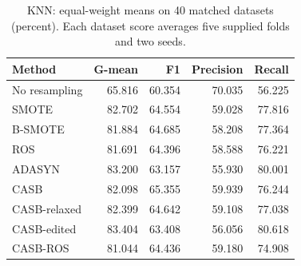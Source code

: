 \begin{table}[pos=!htbp]
\centering\small
\caption{KNN: equal-weight means on 40 matched datasets (percent). Each dataset score averages five supplied folds and two seeds.}\label{tab:scores_knn}
\begin{tabular}{lrrrr}\toprule
Method & G-mean & F1 & Precision & Recall \\
\midrule
No resampling & 65.816 & 60.354 & 70.035 & 56.225 \\
SMOTE & 82.702 & 64.554 & 59.028 & 77.816 \\
B-SMOTE & 81.884 & 64.685 & 58.208 & 77.364 \\
ROS & 81.691 & 64.396 & 58.588 & 76.221 \\
ADASYN & 83.200 & 63.157 & 55.930 & 80.001 \\
CASB & 82.098 & 65.355 & 59.939 & 76.244 \\
CASB-relaxed & 82.399 & 64.642 & 59.108 & 77.038 \\
CASB-edited & 83.404 & 63.408 & 56.056 & 80.618 \\
CASB-ROS & 81.044 & 64.436 & 59.180 & 74.908 \\
\bottomrule\end{tabular}
\end{table}
